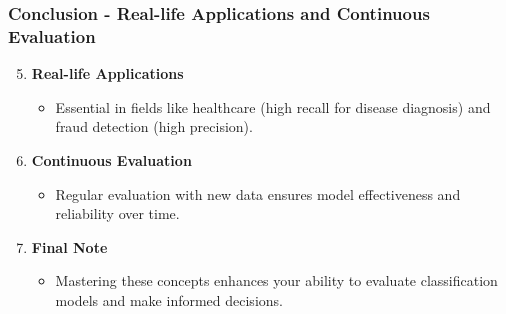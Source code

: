 \documentclass[aspectratio=169]{beamer}
\begin{document}
\begin{frame}[fragile]
    \frametitle{Conclusion - Real-life Applications and Continuous Evaluation}
    \begin{enumerate}
        \setcounter{enumi}{4}
        \item \textbf{Real-life Applications}
        \begin{itemize}
            \item Essential in fields like healthcare (high recall for disease diagnosis) and fraud detection (high precision).
        \end{itemize}
        \item \textbf{Continuous Evaluation}
        \begin{itemize}
            \item Regular evaluation with new data ensures model effectiveness and reliability over time.
        \end{itemize}
        \item \textbf{Final Note}
        \begin{itemize}
            \item Mastering these concepts enhances your ability to evaluate classification models and make informed decisions.
        \end{itemize}
    \end{enumerate}
\end{frame}
\end{document}
